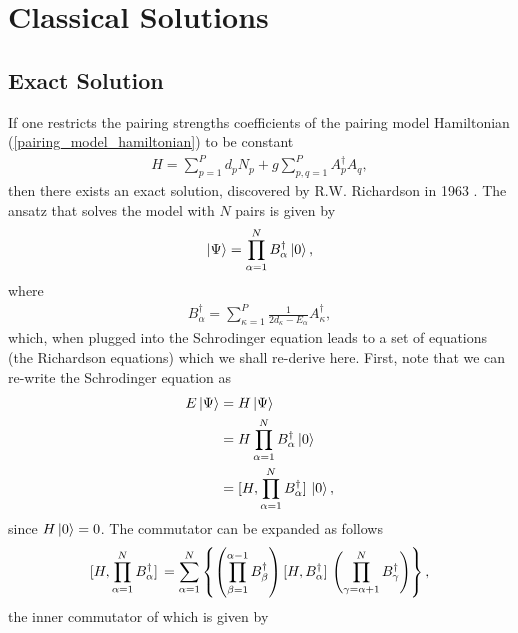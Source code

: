 \documentclass[Dual]{msu-thesis}
\begin{document}
\section{Classical Solutions}

\subsection{Exact Solution}

If one restricts the pairing strengths coefficients of the pairing model Hamiltonian (\ref{pairing_model_hamiltonian}) to be constant
\begin{align}
\label{pairing_model_hamiltonian_constant_g}
H=\sum_{p=1}^Pd_pN_p+g\sum_{p,q=1}^PA^\dagger_pA_q,
\end{align}
then there exists an exact solution, discovered by R.W. Richardson in 1963 \cite{ref:rich1}. The ansatz that solves the model with $N$ pairs is given by
\begin{align}
\label{richardson_ansatz}
\ket{\Psi}=\prod_{\alpha=1}^N B^\dagger_{\alpha}\ket{0},
\end{align}
where
\begin{align}
B^\dagger_\alpha=\sum_{\kappa=1}^P\frac{1}{2d_\kappa-E_\alpha}A^\dagger_\kappa,
\end{align}
which, when plugged into the Schrodinger equation leads to a set of equations (the Richardson equations) which we shall re-derive \cite{ref:rich_der} here. First, note that we can re-write the Schrodinger equation as
\begin{align}
\label{richardson_shcrodinger}
E\ket{\Psi}
&=
H\ket{\Psi}
\nonumber
\\
&=
H\prod_{\alpha=1}^NB^\dagger_{\alpha}\ket{0}
\nonumber
\\
&=
\comm*{H}{\prod_{\alpha=1}^NB^\dagger_{\alpha}}\ket{0},
\end{align}
since $H\ket{0}=0$. The commutator can be expanded as follows
\begin{align}
\label{expanded_commutator_HBd}
\comm*{H}{\prod_{\alpha=1}^N B^\dagger_{\alpha}}
=
\sum_{\alpha=1}^N
\left\{
\left(\prod_{\beta=1}^{\alpha-1}B^\dagger_\beta\right)
\comm*{H}{B^\dagger_\alpha}
\left(\prod_{\gamma=\alpha+1}^NB^\dagger_\gamma\right)
\right\},
\end{align}
the inner commutator of which is given by
\end{document}
